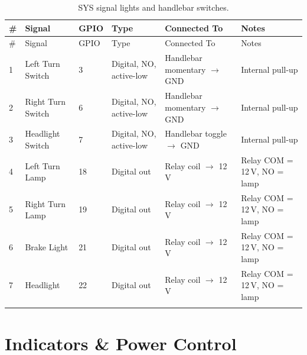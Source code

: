 \documentclass[12pt,a4paper,oneside]{report}
\begin{document}
\begin{center}
\begin{longtable}{p{4mm} p{28mm} p{8mm} p{24mm} p{30mm} p{44mm}}
\toprule
\# & Signal & GPIO & Type & Connected To & Notes \\
\midrule
\endfirsthead
\toprule
\# & Signal & GPIO & Type & Connected To & Notes \\
\midrule
\endhead
1 & Left Turn Switch  & 3  & Digital, NO, active-low & Handlebar momentary $\rightarrow$ GND & Internal pull-up \\
2 & Right Turn Switch & 6  & Digital, NO, active-low & Handlebar momentary $\rightarrow$ GND & Internal pull-up \\
3 & Headlight Switch  & 7  & Digital, NO, active-low & Handlebar toggle $\rightarrow$ GND   & Internal pull-up \\
4 & Left Turn Lamp    & 18 & Digital out & Relay coil $\rightarrow$ 12\,V & Relay COM = 12\,V, NO = lamp \\
5 & Right Turn Lamp   & 19 & Digital out & Relay coil $\rightarrow$ 12\,V & Relay COM = 12\,V, NO = lamp \\
6 & Brake Light       & 21 & Digital out & Relay coil $\rightarrow$ 12\,V & Relay COM = 12\,V, NO = lamp \\
7 & Headlight         & 22 & Digital out & Relay coil $\rightarrow$ 12\,V & Relay COM = 12\,V, NO = lamp \\
\bottomrule
\caption{SYS signal lights and handlebar switches.}
\end{longtable}
\end{center}

\section{Indicators \& Power Control}
\end{document}
